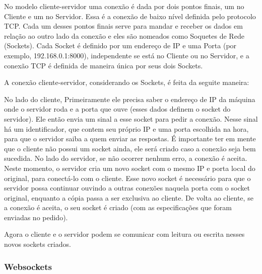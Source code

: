 \documentclass[a4paper,12pt]{article}
\begin{document}
No modelo cliente-servidor uma conexão é dada por dois pontos finais, um no Cliente e um no Servidor. Essa é a conexão de baixo nível definida pelo protocolo TCP. Cada um desses pontos finais serve para mandar e receber os dados em relação ao outro lado da conexão e eles são nomeados como Soquetes de Rede (Sockets). Cada Socket é definido por um endereço de IP e uma Porta (por exemplo, 192.168.0.1:8000), independente se está no Cliente ou no Servidor, e a conexão TCP é definida de maneira única por seus dois Sockets.

A conexão cliente-servidor, considerando os Sockets, é feita da seguite maneira:

No lado do cliente, Primeiramente ele precisa saber o endereço de IP da máquina onde o servidor roda e a porta que ouve (esses dados definem o socket do servidor). Ele então envia um sinal a esse socket para pedir a conexão. Nesse sinal há um identificador, que contem seu próprio IP e uma porta escolhida na hora, para que o servidor saiba a quem enviar as respostas. É importante ter em mente que o cliente não possui um socket ainda, ele será criado caso a conexão seja bem sucedida.
No lado do servidor, se não ocorrer nenhum erro, a conexão é aceita. Neste momento, o servidor cria um novo socket com o mesmo IP e porta local do original, para conectá-lo com o cliente. Esse novo socket é necessário para que o servidor possa continuar ouvindo a outras conexões naquela porta com o socket original, enquanto a cópia passa a ser exclusiva ao cliente.
De volta ao cliente, se a conexão é aceita, o seu socket é criado (com as especificações que foram enviadas no pedido).

Agora o cliente e o servidor podem se comunicar com leitura ou escrita nesses novos sockets criados.





\subsubsection{Websockets}
\end{document}
